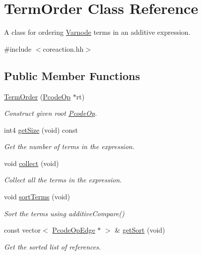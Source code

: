 \hypertarget{class_term_order}{}\section{Term\+Order Class Reference}
\label{class_term_order}


A class for ordering \mbox{\hyperlink{class_varnode}{Varnode}} terms in an additive expression.  




{\ttfamily \#include $<$coreaction.\+hh$>$}

\subsection*{Public Member Functions}
\begin{DoxyCompactItemize}
\item 
\mbox{\hyperlink{class_term_order_a9bf3ae6419089df03778601918b1bbcb}{Term\+Order}} (\mbox{\hyperlink{class_pcode_op}{Pcode\+Op}} $\ast$rt)
\begin{DoxyCompactList}\small\item\em Construct given root \mbox{\hyperlink{class_pcode_op}{Pcode\+Op}}. \end{DoxyCompactList}\item 
int4 \mbox{\hyperlink{class_term_order_a80c74328029feca80764dd5daf77332f}{get\+Size}} (void) const
\begin{DoxyCompactList}\small\item\em Get the number of terms in the expression. \end{DoxyCompactList}\item 
void \mbox{\hyperlink{class_term_order_aa9539a5ed4aa2029cf780dbd18db4370}{collect}} (void)
\begin{DoxyCompactList}\small\item\em Collect all the terms in the expression. \end{DoxyCompactList}\item 
void \mbox{\hyperlink{class_term_order_aa90a1457bc5dd8acd997cf59ff966893}{sort\+Terms}} (void)
\begin{DoxyCompactList}\small\item\em Sort the terms using additive\+Compare() \end{DoxyCompactList}\item 
const vector$<$ \mbox{\hyperlink{class_pcode_op_edge}{Pcode\+Op\+Edge}} $\ast$ $>$ \& \mbox{\hyperlink{class_term_order_a264c1976851310b98f7e65d4becbce56}{get\+Sort}} (void)
\begin{DoxyCompactList}\small\item\em Get the sorted list of references. \end{DoxyCompactList}\end{DoxyCompactItemize}


